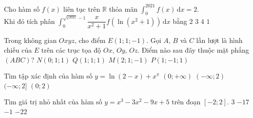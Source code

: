 \begin{ex}%
	Cho hàm số $f(x)$ liên tục trên $\mathbb{R}$ thỏa mãn $\displaystyle\int_{0}^{2021} f(x)\mathrm{\,d}x=2$.\\
	Khi đó tích phân $\displaystyle\int_{0}^{\sqrt{e^{2021}}-1}\dfrac{x}{x^{2}+1} f\left(\ln \left(x^{2}+1\right)\right)\mathrm{\,d}x$ bằng
	\choice
	{$2$}
	{$3$}
	{$4$}
	{\True $1$}
\end{ex}

\begin{ex}%
	Trong không gian $Oxyz$, cho điểm $E(1; 1;-1)$. Gọi $A$, $B$ và $C$ lần lượt là hình chiếu của $E$ trên các trục tọa độ $Ox$, $Oy$, $Oz$. Điểm nào sau đây thuộc mặt phẳng $(ABC)$?
	\choice
	{$N(0; 1; 1)$}
	{\True $Q(1; 1; 1)$}
	{$M(2; 1;-1)$}
	{$P(1;-1; 1)$}
\end{ex}


\begin{ex}%
	Tìm tập xác định của hàm số $y=\ln (2-x)+{x}^{\pi}$
	\choice 
	{$(0;+\infty)$}
	{$(-\infty;2)$}
	{$(-\infty;2]$}
	{\True $(0;2)$}
\end{ex} 

\begin{ex}%
	Tìm giá trị nhỏ nhất của hàm số $y=x^3-3x^2-9x+5$ trên đoạn $[-2;2]$.
	\choice 
	{$3$}
	{\True $-17$}
	{$-1$}
	{$-22$}
\end{ex} 

